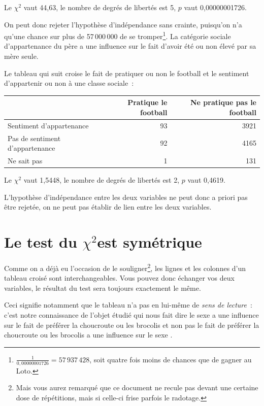 \documentclass[a4paper,10pt,twoside,francais]{report}
\newcommand{\chid}{$\chi^2$\xspace}
\newcommand{\chidpdf}{\texorpdfstring{$\chi^2$\xspace}{X\texttwosuperior\xspace}}
\begin{document}
Le \chid vaut 44,63, le nombre de degrés de libertés est 5, $p$ vaut
0,00000001726.

On peut donc rejeter l'hypothèse d'indépendance sans crainte,
puisqu'on n'a qu'une chance sur plus de 57\,000\,000 de se
tromper\footnote{$\frac{1}{0,00000001726} = 57\,937\,428$, soit quatre
fois moins de chances que de gagner au Loto.}. La
catégorie sociale d'appartenance du père a une influence sur le fait
d'avoir été ou non élevé par sa mère seule.

Le tableau qui suit croise le fait de pratiquer ou non le football et
le sentiment d'appartenir ou non à une classe sociale~:

\begin{center}
  \begin{tabular}[!h]{lrr}
    \toprule
     & Pratique le football & Ne pratique pas le football\\
    \midrule
    Sentiment d'appartenance & 93 & 3921 \\
    Pas de sentiment d'appartenance & 92 & 4165 \\
    Ne sait pas & 1 & 131 \\ 
    \bottomrule
  \end{tabular}
\end{center}

Le \chid vaut 1,5448, le nombre de degrés de libertés est 2, $p$ vaut
0,4619.

L'hypothèse d'indépendance entre les deux variables ne peut donc a
priori pas être rejetée, on ne peut pas établir de lien entre les deux
variables.


\section{Le test du \chidpdf est symétrique}
\label{ssec-sym}

Comme on a déjà eu l'occasion de le souligner\footnote{Mais vous aurez
remarqué que ce document ne recule pas devant une certaine dose de
répétitions, mais si celle-ci frise parfois le radotage.}, les
lignes et les colonnes d'un tableau croisé sont interchangeables. 
Vous pouvez donc échanger vos deux variables, le résultat du test
sera toujours exactement le même.

Ceci signifie notamment que le tableau n'a pas en lui-même de
\textit{sens de lecture}~: c'est notre connaissance de l'objet étudié
qui nous fait dire \og le sexe a une influence sur le fait de préférer
la choucroute ou les brocolis \fg{} et non pas \og le fait de préférer
la choucroute ou les brocolis a une influence sur le sexe \fg{}.
\end{document}
